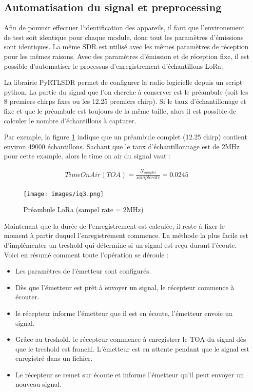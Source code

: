 \subsection{Automatisation du signal et preprocessing}

Afin de pouvoir effectuer l'identification des appareils, il faut que l'environement de test soit identique pour chaque module, donc tout les paramètres d'émissions sont identiques. La même SDR est utilisé avec les mêmes paramètres de réception pour les mêmes raisons. Avec des paramètres d'émission et de réception fixe, il est possible d'automatiser le processus d'enregistrement d'échantillons LoRa.

La librairie PyRTLSDR permet de configurer la radio logicielle depuis un script python. La partie du signal que l'on cherche à conserver est le préambule (soit les 8 premiers chirps fixes ou les 12.25 premiers chirp). Si le taux d'échantillonage et fixe et que le préambule est toujours de la même taille, alors il est possible de calculer le nombre d'échantillons à capturer. 

Par exemple, la figure \ref{term311} indique que un préambule complet (12.25 chirp) contient environ 49000 échantillons. Sachant que le taux d'échantillonnage est de 2MHz pour cette example, alors le time on air du signal vaut :

\begin{align}
    Time On Air (TOA) = \frac{N_{samples}}{sample rate} = 0.0245
\end{align}

\begin{figure}[h]
\centering

\texttt{[image: images/iq3.png]}
\caption{Préambule LoRa (sampel rate = 2MHz)}\label{term311}
\end{figure}

Maintenant que la durée de l'enregistrement est calculée, il reste à fixer le moment à partir duquel l'enregistrement commence. La méthode la plus facile est d'implémenter un treshold qui détermine si un signal est reçu durant l'écoute. Voici en résumé comment toute l'opération se déroule :

\begin{itemize}
\item Les paramètres de l'émetteur sont configurés. 
\item Dès que l'émetteur est prêt à envoyer un signal, le récepteur commence à écouter.
\item le récepteur informe l'émetteur que il est en écoute, l'émetteur envoie un signal.
\item Grâce au treshold, le récepteur commence à enregistrer le TOA du signal dès que le treshold est franchi. L'émetteur est en attente pendant que le signal est enregistré dans un fichier.
\item Le récepteur se remet sur écoute et informe l'émetteur qu'il peut envoyer un nouveau signal.
\end{itemize}

